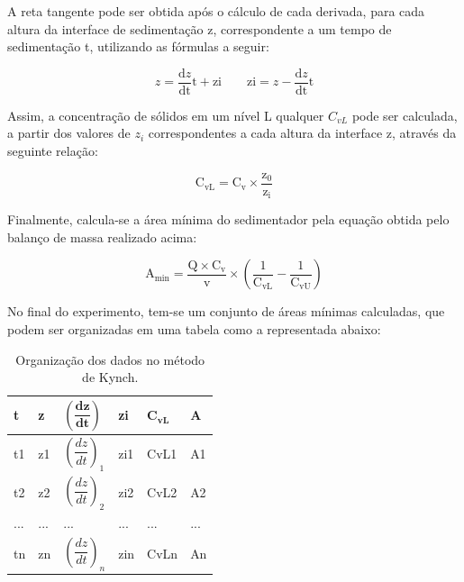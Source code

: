 A reta tangente pode ser obtida após o cálculo de cada derivada, para cada altura da interface de sedimentação z, correspondente a um tempo de sedimentação t, utilizando as fórmulas a seguir:

\begin{equation}\label{key}
z=\frac{\mathrm{d} z}{\mathrm{dt}} \mathrm{t}+\mathrm{zi} \quad \quad \mathrm{zi}=z-\frac{\mathrm{d} z}{\mathrm{dt}} \mathrm{t}
\end{equation}

Assim, a concentração de sólidos em um nível L qualquer $ C_{vL} $ pode ser calculada, a partir dos valores de $ z_{i} $ correspondentes a cada altura da interface z, através da seguinte relação:

\begin{equation}\label{key}
\mathrm{C_{vL}}=\mathrm{C_{v}} \times \frac{\mathrm{z} _{0}}{\mathrm{z_{i}}}
\end{equation}

Finalmente, calcula-se a área mínima do sedimentador pela equação obtida pelo balanço de massa realizado acima:

\begin{equation}\label{key}
\operatorname{A_{min}}=\frac{\mathrm{Q} \times \mathrm{C_{v}}}{\mathrm{v}} \times\left(\frac{1}{\mathrm{C_{vL}}}-\frac{1}{\mathrm{C_{vU}}}\right)
\end{equation}

No final do experimento, tem-se um conjunto de áreas mínimas calculadas, que podem ser organizadas em uma tabela como a representada abaixo:

	

\begin{table}[H]
	\centering
	\begin{tabular}{|l|l|l|l|l|l|}
		\hline
		\textbf{t} & \textbf{z} & $ \mathbf{\left( \dfrac{d z}{dt} \right)} $ & \textbf{zi} & $ \mathbf{C_{vL}} $ & \textbf{A} \\ \hline
		t1 & z1 & $ \left ( \dfrac{d z}{dt}\right )_{1} $ & zi1 & CvL1 & A1 \\ \hline
		t2 & z2 & $ \left ( \dfrac{d z}{dt} \right )_{2} $ & zi2 & CvL2 & A2 \\ \hline
		... & ... & ... & ... & ... & ... \\ \hline
		tn & zn & $ \left ( \dfrac{d z}{dt}\right )_{n} $ & zin & CvLn & An \\ \hline
	\end{tabular}
	\caption{Organização dos dados no método de Kynch.}
	\label{kynch}
\end{table}


